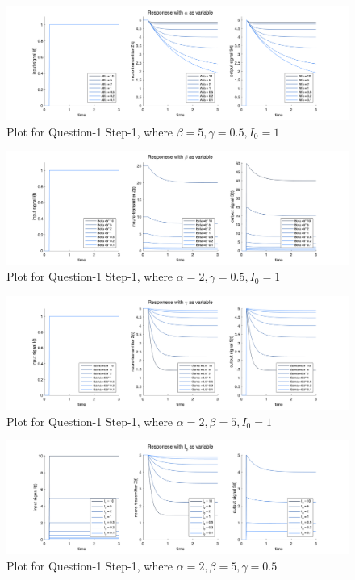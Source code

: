 \documentclass[12pt,letterpaper]{article}
\theoremstyle{definition}
\begin{document}
\begin{figure}
    \centering
    \includegraphics[scale=0.28]{picture/q1-1-1.png}
    \caption{Plot for Question-1 Step-1, where $\beta = 5, \gamma = 0.5, I_0 = 1$}
    \label{fig:my_label1}
\end{figure}
\begin{figure}
    \centering
    \includegraphics[scale=0.28]{picture/q1-1-2.png}
    \caption{Plot for Question-1 Step-1, where $\alpha = 2, \gamma = 0.5, I_0 = 1$}
    \label{fig:my_label2}
\end{figure}
\begin{figure}
    \centering
    \includegraphics[scale=0.28]{picture/q1-1-3.png}
    \caption{Plot for Question-1 Step-1, where $\alpha = 2, \beta = 5, I_0 = 1$}
    \label{fig:my_label3}
\end{figure}
\begin{figure}
    \centering
    \includegraphics[scale=0.28]{picture/q1-1-4.png}
    \caption{Plot for Question-1 Step-1, where $\alpha = 2, \beta = 5, \gamma = 0.5$}
    \label{fig:my_label4}
\end{figure}
\end{document}
